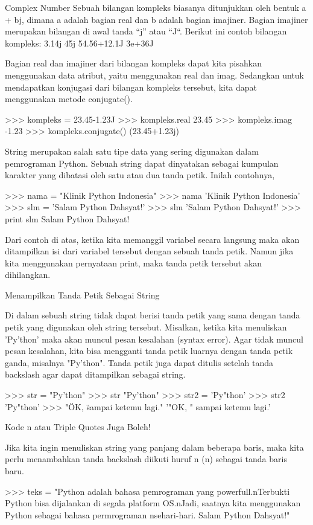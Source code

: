 Complex Number
Sebuah bilangan kompleks biasanya ditunjukkan oleh bentuk a + bj, dimana a adalah bagian real dan b adalah bagian imajiner. Bagian imajiner merupakan bilangan di awal tanda “j” atau “J“. Berikut ini contoh bilangan kompleks:
3.14j 45j 54.56+12.1J 3e+36J

Bagian real dan imajiner dari bilangan kompleks dapat kita pisahkan menggunakan data atribut, yaitu menggunakan real dan imag. Sedangkan untuk mendapatkan konjugasi dari bilangan kompleks tersebut, kita dapat menggunakan metode conjugate().

>>> kompleks = 23.45-1.23J
>>> kompleks.real
23.45
>>> kompleks.imag
-1.23
>>> kompleks.conjugate()
(23.45+1.23j)

String merupakan salah satu tipe data yang sering digunakan dalam pemrograman Python. Sebuah string dapat dinyatakan sebagai kumpulan karakter yang dibatasi oleh satu atau dua tanda petik. Inilah contohnya,

>>> nama = "Klinik Python Indonesia"
>>> nama
'Klinik Python Indonesia'
>>> slm = 'Salam Python Dahsyat!'
>>> slm
'Salam Python Dahsyat!'
>>> print slm
Salam Python Dahsyat!

Dari contoh di atas, ketika kita memanggil variabel secara langsung maka akan ditampilkan isi dari variabel tersebut dengan sebuah tanda petik. Namun jika kita menggunakan pernyataan print, maka tanda petik tersebut akan dihilangkan.

Menampilkan Tanda Petik Sebagai String

Di dalam sebuah string tidak dapat berisi tanda petik yang sama dengan tanda petik yang digunakan oleh string tersebut. Misalkan, ketika kita menuliskan 'Py'thon' maka akan muncul pesan kesalahan (syntax error). Agar tidak muncul pesan kesalahan, kita bisa mengganti tanda petik luarnya dengan tanda petik ganda, misalnya "Py'thon". Tanda petik juga dapat ditulis setelah tanda backslash agar dapat ditampilkan sebagai string.

>>> str = "Py'thon"
>>> str
"Py'thon"
>>> str2 = 'Py"thon'
>>> str2
'Py"thon'
>>> "\"OK, \" sampai ketemu lagi."
'"OK, " sampai ketemu lagi.'

Kode n atau Triple Quotes Juga Boleh!

Jika kita ingin menuliskan string yang panjang dalam beberapa baris, maka kita perlu menambahkan tanda backslash diikuti huruf n (n) sebagai tanda baris baru.

>>> teks = "Python adalah bahasa pemrograman yang powerfull.nTerbukti Python bisa dijalankan di segala platform OS.nJadi, saatnya kita menggunakan Python sebagai bahasa permrograman nsehari-hari. Salam Python Dahsyat!"

